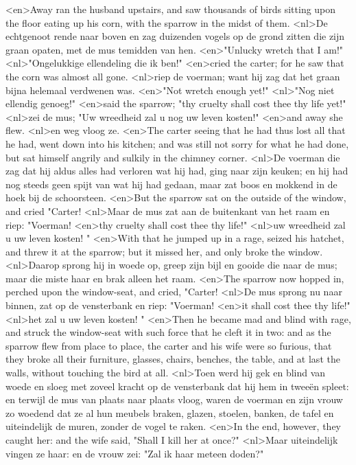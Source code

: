 <en>Away ran the husband upstairs, and saw thousands of birds sitting upon the floor eating up his corn, with the sparrow in the midst of them.
<nl>De echtgenoot rende naar boven en zag duizenden vogels op de grond zitten die zijn graan opaten, met de mus temidden van hen.
<en>"Unlucky wretch that I am!"
<nl>"Ongelukkige ellendeling die ik ben!"
<en>cried the carter; for he saw that the corn was almost all gone.
<nl>riep de voerman; want hij zag dat het graan bijna helemaal verdwenen was.
<en>"Not wretch enough yet!"
<nl>"Nog niet ellendig genoeg!"
<en>said the sparrow; "thy cruelty shall cost thee thy life yet!"
<nl>zei de mus; "Uw wreedheid zal u nog uw leven kosten!"
<en>and away she flew.
<nl>en weg vloog ze.
<en>The carter seeing that he had thus lost all that he had, went down into his kitchen; and was still not sorry for what he had done, but sat himself angrily and sulkily in the chimney corner.
<nl>De voerman die zag dat hij aldus alles had verloren wat hij had, ging naar zijn keuken; en hij had nog steeds geen spijt van wat hij had gedaan, maar zat boos en mokkend in de hoek bij de schoorsteen.
<en>But the sparrow sat on the outside of the window, and cried "Carter!
<nl>Maar de mus zat aan de buitenkant van het raam en riep: "Voerman!
<en>thy cruelty shall cost thee thy life!"
<nl>uw wreedheid zal u uw leven kosten! "
<en>With that he jumped up in a rage, seized his hatchet, and threw it at the sparrow; but it missed her, and only broke the window.
<nl>Daarop sprong hij in woede op, greep zijn bijl en gooide die naar de mus; maar die miste haar en brak alleen het raam.
<en>The sparrow now hopped in, perched upon the window-seat, and cried, "Carter!
<nl>De mus sprong nu naar binnen, zat op de vensterbank en riep: "Voerman!
<en>it shall cost thee thy life!"
<nl>het zal u uw leven kosten! "
<en>Then he became mad and blind with rage, and struck the window-seat with such force that he cleft it in two: and as the sparrow flew from place to place, the carter and his wife were so furious, that they broke all their furniture, glasses, chairs, benches, the table, and at last the walls, without touching the bird at all.
<nl>Toen werd hij gek en blind van woede en sloeg met zoveel kracht op de vensterbank dat hij hem in tweeën spleet: en terwijl de mus van plaats naar plaats vloog, waren de voerman en zijn vrouw zo woedend dat ze al hun meubels braken, glazen, stoelen, banken, de tafel en uiteindelijk de muren, zonder de vogel te raken.
<en>In the end, however, they caught her: and the wife said, "Shall I kill her at once?"
<nl>Maar uiteindelijk vingen ze haar: en de vrouw zei: "Zal ik haar meteen doden?"
